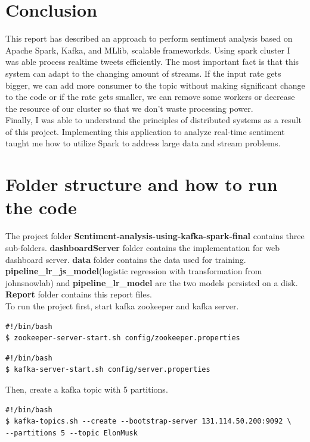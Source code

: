 \documentclass[12pt,a4paper]{report}
\begin{document}
\section{Conclusion}
This report has described an approach to perform sentiment analysis based on Apache Spark, Kafka, and MLlib, scalable frameworkds. Using spark cluster I was able process realtime tweets efficiently. The most important fact is that this system can adapt to the changing amount of streams. If the input rate gets bigger, we can add more consumer to the topic without making significant change to the code or if the rate gets smaller, we can remove some workers or decrease the resource of our cluster so that we don't waste processing power. \\

Finally, I was able to understand the principles of distributed systems as a result of this project. Implementing this application to analyze real-time sentiment taught me how to utilize Spark to address large data and stream problems.


\section{Folder structure and how to run the code}
The project folder \textbf{Sentiment-analysis-using-kafka-spark-final} contains three sub-folders. \textbf{dashboardServer} folder contains the implementation for web dashboard server. \textbf{data} folder contains the data used for training. \textbf{pipeline\_lr\_js\_model}(logistic regression with transformation from johnsnowlab) and \textbf{pipeline\_lr\_model} are the two models persisted on a disk. \textbf{Report} folder contains this report files.\\

To run the project first, start kafka zookeeper and kafka server.

\begin{verbatim}
#!/bin/bash
$ zookeeper-server-start.sh config/zookeeper.properties
\end{verbatim}

\begin{verbatim}
#!/bin/bash
$ kafka-server-start.sh config/server.properties
\end{verbatim}

Then, create a kafka topic with 5 partitions.
\begin{verbatim}
#!/bin/bash
$ kafka-topics.sh --create --bootstrap-server 131.114.50.200:9092 \
--partitions 5 --topic ElonMusk 
\end{verbatim}
\end{document}
